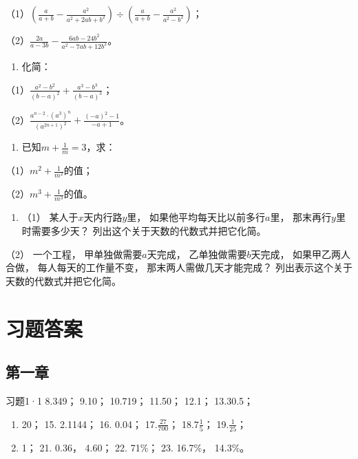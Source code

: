 （1）\(\left(\frac{a}{a + b} - \frac{a^2}{a^2 + 2ab + b^2}\right) \div \left(\frac{a}{a + b} - \frac{a^2}{a^2 - b^2}\right)\)；

（2）\(\frac{2a}{a - 3b} - \frac{6ab - 24b^2}{a^2 - 7ab + 12b^2}\)。

\begin{enumerate}[start=8]
\item
  化简：
\end{enumerate}

（1）\(\frac{a^2 - b^2}{(b - a)^2} + \frac{a^3 - b^3}{(b - a)^3}\)；

（2）\(\frac{a^{n - 2} \cdot (a^3)^n}{(a^{2n + 1})^2} + \frac{(-a)^2 - 1}{-a + 1}\)。

\begin{enumerate}[start=9]
\item
  已知\(m + \frac{1}{m} = 3\)，求：
\end{enumerate}

（1）\(m^2 + \frac{1}{m^2}\)的值；

（2）\(m^3 + \frac{1}{m^3}\)的值。

\begin{enumerate}[start=10]
\item
  （1） 某人于\(x\)天内行路\(y\)里， 如果他平均每天比以前多行\(a\)里，
  那末再行\(y\)里时需要多少天？ 列出这个关于天数的代数式并把它化简。
\end{enumerate}

（2） 一个工程， 甲单独做需要\(a\)天完成， 乙单独做需要\(b\)天完成，
如果甲乙两人合做， 每人每天的工作量不变， 那末两人需做几天才能完成？
列出表示这个关于天数的代数式并把它化简。

\chapter{习题答案}

\section{第一章}

习题1·1 8.349； 9.10； 10.719； 11.50； 12.1； 13.30.5；

\begin{enumerate}[start=14]
\item
  20； 15. 2.1144； 16. 0.04； 17.\(\frac{27}{700}\)；
  18.\(7\frac{1}{5}\)； 19.\(\frac{1}{25}\)；
\item
  1； 21. 0.36， 4.60； 22. 71\%； 23. 16.7\%， 14.3\%。
\end{enumerate}

